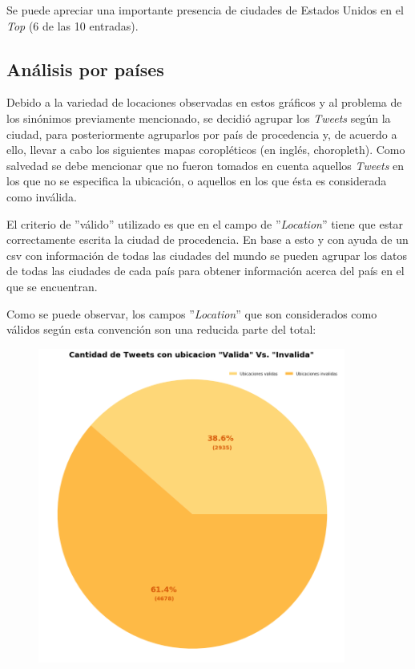 \documentclass[titlepage,a4paper]{article}
\begin{document}
    Se puede apreciar una importante presencia de ciudades de Estados Unidos en el \textit{Top} (6 de las 10 entradas). 
    
    \subsection{Análisis por países}
    
    Debido a la variedad de locaciones observadas en estos gráficos y al problema de los sinónimos previamente mencionado, se decidió agrupar los \textit{Tweets} según la ciudad, para posteriormente agruparlos por país de procedencia y, de acuerdo a ello, llevar a cabo los siguientes mapas coropléticos (en inglés, choropleth). Como salvedad se debe mencionar que no fueron tomados en cuenta aquellos \textit{Tweets} en los que no se especifica la ubicación, o aquellos en los que ésta es considerada como inválida.
    
    El criterio de ''válido'' utilizado es que en el campo de ''\textit{Location}'' tiene que estar correctamente escrita la ciudad de procedencia. En base a esto y con ayuda de un csv con información de todas las ciudades del mundo se pueden agrupar los datos de todas las ciudades de cada país para obtener información acerca del país en el que se encuentran.
    
    Como se puede observar, los campos ''\textit{Location}'' que son considerados como válidos según esta convención son una reducida parte del total: 
    
    \begin{figure}[H]
    \raggedleft
    \includegraphics[width=0.9\textwidth]{graficos/Analisis de Locacion/Cantidad_validos_vs_Invalidos.png}
    \caption{}
    \end{figure}
    
\end{document}
